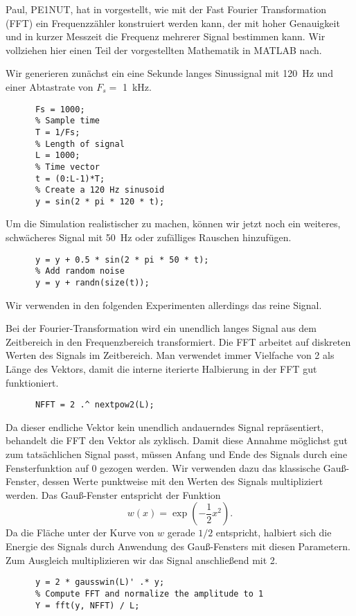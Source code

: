 \documentclass{exercise}
\begin{document}
  \lstset{language=Matlab, numbers=none}

  \task[][Einleitung]
    Paul, PE1NUT, hat in \cite{paul} vorgestellt, wie mit
    der Fast Fourier Transformation (FFT) ein Frequenzzähler konstruiert werden kann, der mit hoher Genauigkeit und in kurzer Messzeit die Frequenz mehrerer Signal bestimmen kann. Wir vollziehen hier einen Teil der vorgestellten Mathematik in MATLAB nach.

  \task[][Signalerzeugung]
    Wir generieren zunächst ein eine Sekunde langes Sinussignal mit 120~Hz und einer Abtastrate von $F_s = $ 1~kHz.
    \begin{lstlisting}[gobble=6]
      % Sampling frequency
      Fs = 1000;
      % Sample time
      T = 1/Fs;
      % Length of signal
      L = 1000;
      % Time vector
      t = (0:L-1)*T;
      % Create a 120 Hz sinusoid
      y = sin(2 * pi * 120 * t);
    \end{lstlisting}
    Um die Simulation realistischer zu machen, können wir jetzt noch ein weiteres, schwächeres Signal mit 50~Hz oder zufälliges Rauschen hinzufügen.
    \begin{lstlisting}[gobble=6]
      % Add a 50 Hz sinusoid
      y = y + 0.5 * sin(2 * pi * 50 * t);
      % Add random noise
      y = y + randn(size(t));
    \end{lstlisting}
    Wir verwenden in den folgenden Experimenten allerdings das reine Signal.

    Bei der Fourier-Transformation wird ein unendlich langes Signal aus dem Zeitbereich in den Frequenzbereich transformiert. Die FFT arbeitet auf diskreten Werten des Signals im Zeitbereich. Man verwendet immer Vielfache von 2 als Länge des Vektors, damit die interne iterierte Halbierung in der FFT gut funktioniert.
    \begin{lstlisting}[gobble=6]
      % Next power of 2 from length of y
      NFFT = 2 .^ nextpow2(L);
    \end{lstlisting}
    Da dieser endliche Vektor kein unendlich andauerndes Signal repräsentiert, behandelt die FFT den Vektor als zyklisch. Damit diese Annahme möglichst gut zum tatsächlichen Signal passt, müssen Anfang und Ende des Signals durch eine Fensterfunktion auf 0 gezogen werden. Wir verwenden dazu das klassische Gauß-Fenster, dessen Werte punktweise mit den Werten des Signals multipliziert werden. Das Gauß-Fenster entspricht der Funktion
    \[ w(x) = \exp\left(-\frac12 x^2\right). \]
    Da die Fläche unter der Kurve von $w$ gerade $1/2$ entspricht, halbiert sich
    die Energie des Signals durch Anwendung des Gauß-Fensters mit diesen Parametern. Zum Ausgleich multiplizieren wir das Signal anschließend mit 2.
    \begin{lstlisting}[gobble=6]
      % Apply gaussian window function to input signal
      y = 2 * gausswin(L)' .* y;
      % Compute FFT and normalize the amplitude to 1
      Y = fft(y, NFFT) / L;
    \end{lstlisting}
\end{document}
